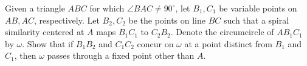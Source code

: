 Given a triangle $ABC$ for which $\angle BAC \neq 90^{\circ}$, let $B_1, C_1$ be variable points on $AB,AC$, respectively. Let $B_2,C_2$ be the points on line $BC$ such that a spiral similarity centered at $A$ maps $B_1C_1$ to $C_2B_2$. Denote the circumcircle of $AB_1C_1$ by $\omega$. Show that if $B_1B_2$ and $C_1C_2$ concur on $\omega$ at a point distinct from $B_1$ and $C_1$, then $\omega$ passes through a fixed point other than $A$.

